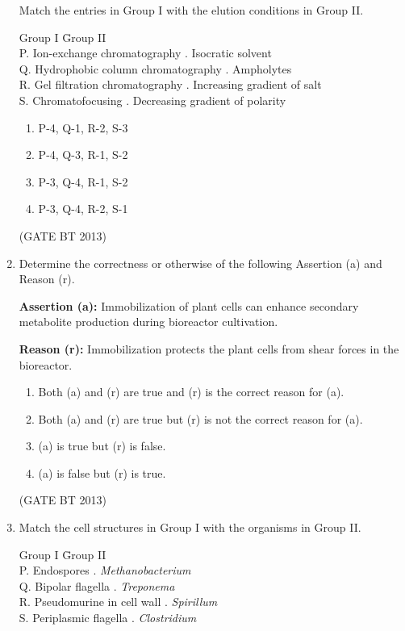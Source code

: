 \documentclass[journal,12pt,onecolumn]{IEEEtran}
\theoremstyle{remark}
\begin{document}
\begin{enumerate}
Match the entries in Group I with the elution conditions in Group II.

\begin{tabbing}
Group I \hspace{6cm} \= Group II \\
P. Ion-exchange chromatography . Isocratic solvent \\
Q. Hydrophobic column chromatography . Ampholytes \\
R. Gel filtration chromatography . Increasing gradient of salt \\
S. Chromatofocusing . Decreasing gradient of polarity \\
\end{tabbing}

\begin{enumerate}[label=(\Alph*)]
    \item P-4, Q-1, R-2, S-3
    \item P-4, Q-3, R-1, S-2
    \item P-3, Q-4, R-1, S-2
    \item P-3, Q-4, R-2, S-1
\end{enumerate} 
\hfill (GATE BT 2013)
\item 

Determine the correctness or otherwise of the following Assertion (a) and Reason (r).

\textbf{Assertion (a):} Immobilization of plant cells can enhance secondary metabolite production during bioreactor cultivation.

\textbf{Reason (r):} Immobilization protects the plant cells from shear forces in the bioreactor.

\begin{enumerate}[label=(\Alph*)]
    \item Both (a) and (r) are true and (r) is the correct reason for (a).
    \item Both (a) and (r) are true but (r) is not the correct reason for (a).
    \item (a) is true but (r) is false.
    \item (a) is false but (r) is true.
\end{enumerate} 
\hfill (GATE BT 2013)
\item 

Match the cell structures in Group I with the organisms in Group II.

\begin{tabbing}
Group I \hspace{3.5cm} \= Group II \\
P. Endospores . \textit{Methanobacterium} \\
Q. Bipolar flagella . \textit{Treponema} \\
R. Pseudomurine in cell wall . \textit{Spirillum} \\
S. Periplasmic flagella . \textit{Clostridium} \\
\end{tabbing}


\end{enumerate}
\end{document}
